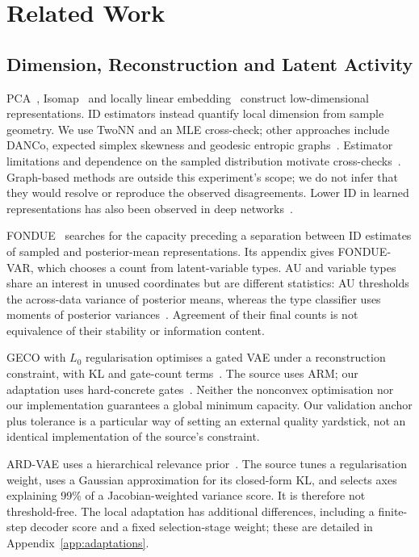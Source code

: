 \documentclass[make,article,submit,pdftex,moreauthors]{Definitions/mdpi}
\begin{document}
\section{Related Work}\label{sec:related}

\subsection{Dimension, Reconstruction and Latent Activity}
PCA~\cite{tippingbishop1999ppca}, Isomap~\cite{tenenbaum2000isomap} and
locally linear embedding~\cite{roweis2000lle} construct low-dimensional
representations. ID estimators instead quantify local dimension from
sample geometry. We use TwoNN and an MLE cross-check; other approaches
include DANCo, expected simplex skewness and geodesic entropic
graphs~\cite{ceruti2014danco,johnsson2015ess,costa2004geodesic}.
Estimator limitations and dependence on the sampled distribution motivate
cross-checks~\cite{camastra2016intrinsic,allegra2020data}.
Graph-based methods are outside this experiment's scope; we do not infer
that they would resolve or reproduce the observed disagreements.
Lower ID in learned representations has also been observed in deep
networks~\cite{ansuini2019intrinsic,pope2021intrinsic}.

FONDUE~\cite{bonheme2022fondue} searches for the capacity preceding a
separation between ID estimates of sampled and posterior-mean
representations. Its appendix gives FONDUE-VAR, which chooses a count from
latent-variable types. AU and variable types share an interest in unused
coordinates but are different statistics: AU thresholds the across-data
variance of posterior means, whereas the type classifier uses moments of
posterior variances~\cite{bonheme2023active}. Agreement of their final
counts is not equivalence of their stability or information content.

GECO with $L_0$ regularisation optimises a gated VAE under a reconstruction
constraint, with KL and gate-count terms~\cite{deboom2020geco,rezende2018geco}.
The source uses ARM; our adaptation uses hard-concrete
gates~\cite{louizos2018l0}. Neither the nonconvex optimisation nor our
implementation guarantees a global minimum capacity. Our validation
anchor plus tolerance is a particular way of setting an external quality
yardstick, not an identical implementation of the source's constraint.

ARD-VAE uses a hierarchical relevance prior~\cite{saha2025ardvae}.
The source tunes a regularisation weight, uses a Gaussian approximation
for its closed-form KL, and selects axes explaining 99\% of a
Jacobian-weighted variance score. It is therefore not threshold-free.
The local adaptation has additional differences, including a finite-step
decoder score and a fixed selection-stage weight; these are detailed in
Appendix~\ref{app:adaptations}.
\end{document}
